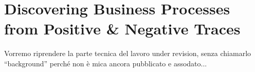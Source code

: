 
\section{Discovering Business Processes from Positive \& Negative Traces}
\label{sec:deviant}


Vorremo riprendere la parte tecnica del lavoro under revision, senza chiamarlo ``background'' perché non è mica ancora pubblicato e assodato...
